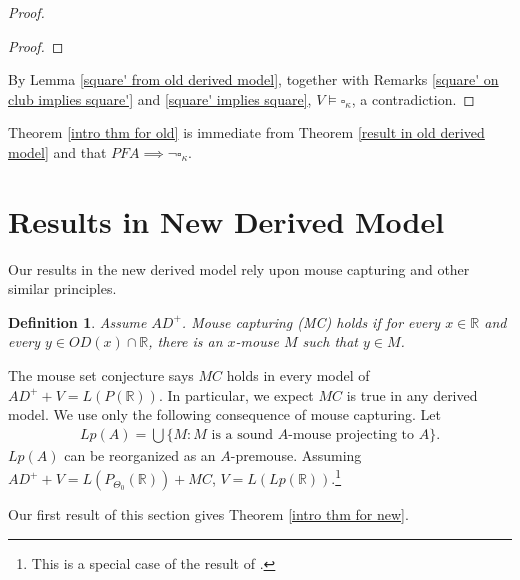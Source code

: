 \documentclass[12pt]{article}
\newtheorem{definition}[theorem]{Definition}
\newcommand\R{\mathbb{R}}
\begin{document}
\begin{proof}
\begin{proof}

    \end{proof}
    
    By Lemma \ref{square' from old derived model}, together with Remarks \ref{square' on club implies square'} and \ref{square' implies square}, $V\models \square_\kappa$, a contradiction.
\end{proof}

Theorem \ref{intro thm for old} is immediate from Theorem \ref{result in old derived model} and that $PFA \implies \neg \square_\kappa$.


\section{Results in New Derived Model}
\label{new derived model section}

Our results in the new derived model rely upon mouse capturing and other similar principles.

\begin{definition}
    Assume $AD^+$. Mouse capturing (MC) holds if for every $x\in \R$ and every $y\in OD(x)\cap \R$, there is an $x$-mouse $M$ such that $y\in M$.
\end{definition}

The mouse set conjecture says $MC$ holds in every model of $AD^+ + V = L(P(\R))$. In particular, we expect $MC$ is true in any derived model. We use only the following consequence of mouse capturing. Let 
\begin{align*}
    Lp(A) = \bigcup \{M : M \text{ is a sound } A \text{-mouse projecting to } A\}.
\end{align*}
$Lp(A)$ can be reorganized as an $A$-premouse. Assuming $AD^+ + V = L(P_{\Theta_0}(\R)) + MC$, $V = L(Lp(\R))$.\footnote{This is a special case of the result of \cite{mscfsor}.}

Our first result of this section gives Theorem \ref{intro thm for new}.
\end{document}
